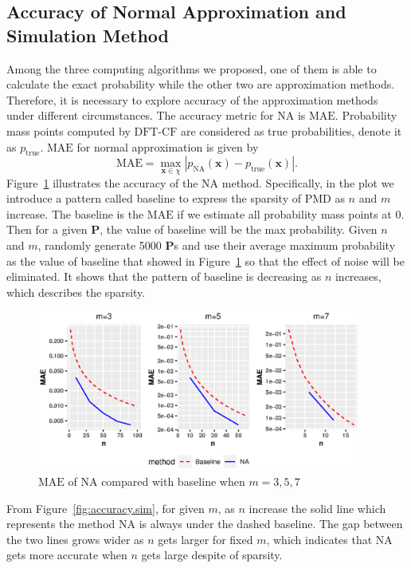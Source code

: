 \documentclass[12pt]{article}
\newcommand{\Pmat}{\mathbf{P}}
\newcommand{\MAE}{{\textrm{MAE}}}
\newcommand{\PMD}{\textrm{PMD}}
\newcommand{\xvec}{\boldsymbol{x}}
\newcommand{\NA}{{\textrm{NA}}}
\newcommand{\dft}{{\textrm{DFT-CF}}}
\begin{document}
\subsection{Accuracy of Normal Approximation and Simulation Method}
Among the three computing algorithms we proposed, one of them is able to calculate the exact probability while the other two are approximation methods. Therefore, it is necessary to explore accuracy of the approximation methods under different circumstances. The accuracy metric for $\NA$ is $\MAE$. Probability mass points computed by $\dft$ are considered as true probabilities, denote it as $p_{\textrm{true}}$.
$\MAE$ for normal approximation is given by
\begin{equation*}
    \MAE = \max_{\xvec \in \chi}|p_{\NA}(\xvec)-p_{\textrm{true}}(\xvec)|.
\end{equation*}
Figure~\ref{fig:mae.na} illustrates the accuracy of the $\NA$ method. Specifically, in the plot we introduce a pattern called baseline to express the sparsity of $\PMD$ as $n$ and $m$ increase. The baseline is the $\MAE$ if we estimate all probability mass points at 0. Then for a given $\Pmat$, the value of baseline will be the max probability. Given $n$ and $m$,  randomly generate 5000 $\Pmat$s and use their average maximum probability as the value of baseline that showed in Figure~\ref{fig:mae.na} so that the effect of noise will be eliminated. It shows that the pattern of baseline is decreasing as $n$ increases, which describes the sparsity. 
\begin{figure}%
\begin{center}
	\includegraphics[width=0.95\textwidth]{figures/normal_mae.eps}
	\caption{$\MAE$ of $\NA$ compared with baseline when $m=3,5,7$}
	\label{fig:mae.na}
\end{center}
\end{figure}
From Figure~\ref{fig:accuracy.sim}, for given $m$, as $n$ increase the solid line which represents the method $\NA$ is always under the dashed baseline. The gap between the two lines grows wider as $n$ gets larger for fixed $m$, which indicates that $\NA$ gets more accurate when $n$ gets large despite of sparsity.
\end{document}
